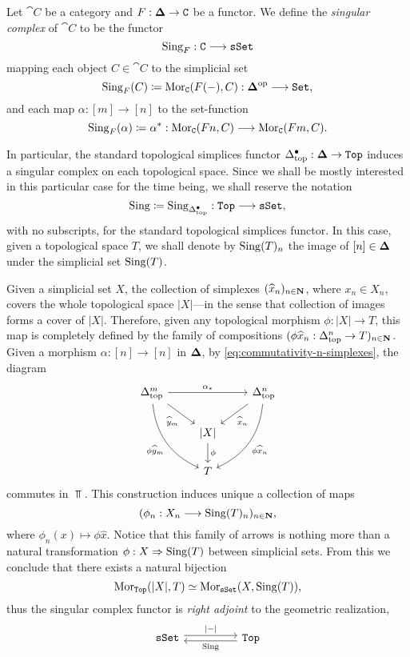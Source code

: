 \begin{definition}
    \label{def:singular-complex-functor}
    Let \(\cat C\) be a category and \(F: {\mathbf{\Delta}} \to \texttt C\) be a functor. We define
    the \emph{singular complex} of \(\cat C\) to be the functor
    \[
        \operatorname{Sing}_F: \texttt C \longrightarrow {\texttt{sSet}}
    \]
    mapping each object \(C \in \cat C\) to the simplicial set
    \[
        \operatorname{Sing}_F(C) \coloneq \operatorname{Mor}_{\texttt C}(F(-), C): {\mathbf{\Delta}}^{\mathrm{op}} \longrightarrow {\texttt{Set}},
    \]
    and each map \(\alpha: [m] \to [n]\) to the set-function
    \[
        \operatorname{Sing}_F(\alpha) \coloneq \alpha^{*}:
        \operatorname{Mor}_{\texttt C}(F n, C) \longrightarrow \operatorname{Mor}_{\texttt C}(F m, C).
    \]

    In particular, the standard topological simplices functor \(\Delta_{\text{top}}^{\bullet}: {\mathbf{\Delta}} \to
    {\texttt{Top}}\) induces a singular complex on each topological space. Since we shall be
    mostly interested in this particular case for the time being, we shall reserve
    the notation
    \[
        \operatorname{Sing} \coloneq \operatorname{Sing}_{\Delta_{\text{top}}^{\bullet}}: {\texttt{Top}} \longrightarrow {\texttt{sSet}},
    \]
    with no subscripts, for the standard topological simplices functor. In this
    case, given a topological space \(T\), we shall denote by \(\operatorname{Sing}(T)_n\) the
    image of \([n] \in {\mathbf{\Delta}}\) under the simplicial set \(\operatorname{Sing}(T)\).
\end{definition}

Given a simplicial set \(X\), the collection of simplexes
\((\widehat{x}_n)_{n \in \mathbf{N}}\), where \(x_n \in X_n\), covers the whole
topological space \(|X|\)---in the sense that collection of images forms a cover
of \(|X|\). Therefore, given any topological morphism \(\phi: |X| \to T\), this
map is completely defined by the family of compositions
\((\phi \widehat{x}_n: \Delta_{\text{top}}^n \to T)_{n \in \mathbf{N}}\). Given a morphism
\(\alpha: [n] \to [n]\) in \({\mathbf{\Delta}}\), by \cref{eq:commutativity-n-simplexes},
the diagram
\[
    \begin{tikzcd}
        \splxtop^m \ar[rr, "\alpha_{*}"]
        \ar[rd, "\widehat y_m"']
        \ar[drd, bend right, "\phi \widehat y_m"']
        & &\splxtop^n \ar[ld, "\widehat x_n"]
        \ar[dld, bend left, "\phi \widehat x_n"] \\
        &{|X|} \ar[d, "\phi"] & \\
        &T &
    \end{tikzcd}
\]
commutes in \(\Top\). This construction induces unique a collection of maps
\[
    (\phi_n: X_n \longrightarrow \operatorname{Sing}(T)_n)_{n \in \mathbf{N}},
\]
where \(\phi_n(x) \mapsto \phi \widehat x\). Notice that this family of arrows
is nothing more than a natural transformation \(\phi: X \Rightarrow \operatorname{Sing}(T)\) between
simplicial sets. From this we conclude that there exists a natural bijection
\[
    \operatorname{Mor}_{{\texttt{Top}}}(|X|, T) \simeq \operatorname{Mor}_{{\texttt{sSet}}}(X, \operatorname{Sing}(T)),
\]
thus the singular complex functor is \emph{right adjoint} to the geometric
realization,
\[
    \begin{tikzcd}
        \sSet \ar[rr, shift left, "{|-|}"] &&\Top \ar[ll, shift left, "\Sing"]
    \end{tikzcd}
\]

